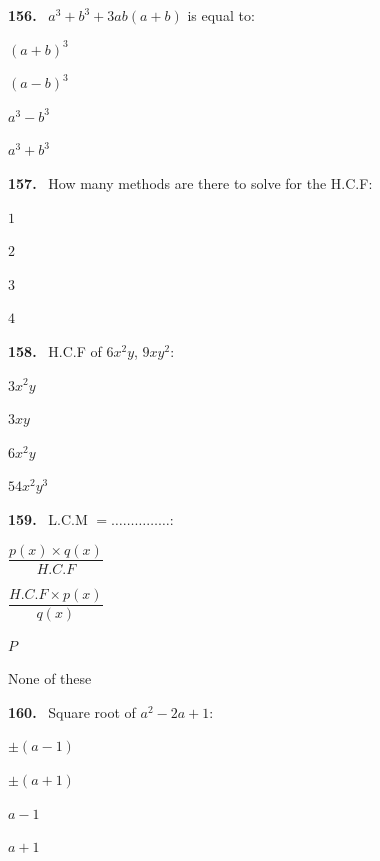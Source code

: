 \documentclass[11pt]{article}
\newenvironment{qenv}[1]{%
  \par\medskip\noindent\textbf{#1.}\ \ignorespaces
}{\par}
\begin{document}
\begin{qenv}{156} $a^3+b^3+3ab(a+b)$ is equal to:
\begin{options} \item $(a+b)^3$ \item $(a-b)^3$ \item $a^3-b^3$ \item $a^3+b^3$ \end{options} \end{qenv}

\begin{qenv}{157} How many methods are there to solve for the H.C.F:
\begin{options} \item $1$ \item $2$ \item $3$ \item $4$ \end{options} \end{qenv}

\begin{qenv}{158} H.C.F of $6x^2y$, $9xy^2$:
\begin{options} \item $3x^2y$ \item $3xy$ \item $6x^2y$ \item $54x^2y^3$ \end{options} \end{qenv}

\begin{qenv}{159} L.C.M $= \ldots\ldots\ldots\ldots\ldots$:
\begin{options} \item $\dfrac{p(x)\times q(x)}{H.C.F}$ \item $\dfrac{H.C.F \times p(x)}{q(x)}$ \item $P$ \item None of these \end{options} \end{qenv}

\begin{qenv}{160} Square root of $a^2-2a+1$:
\begin{options} \item $\pm(a-1)$ \item $\pm(a+1)$ \item $a-1$ \item $a+1$ \end{options} \end{qenv}
\end{document}
